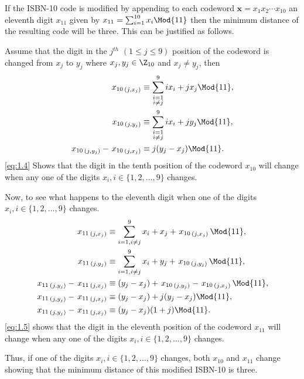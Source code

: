 If the ISBN-10 code is modified by appending to each codeword $\textbf{x}=x_1x_2\cdots x_{10}$ an eleventh digit $x_{11}$ given by $x_{11}=\sum_{i=1}^{10} x_i \Mod{11}$ then the minimum distance of the resulting code will be three. This can be justified as follows.

Assume that the digit in the $j^{th}$  $(1\leq j \leq 9)$ position of the codeword is changed from $x_j$ to $y_j$ where $x_j,y_j \in \Z_{10}$ and $x_j \not= y_j$, then
\begin{align}
\label{eq:1.4}
	\left.x_{10}\right._{(j,x_{j})} &\equiv \sum_{\substack{i=1\\ i\neq j}}^9 ix_i + jx_j \Mod{11},\nonumber\\
	\left.x_{10}\right._{(j,y_{j})} &\equiv \sum_{\substack{i=1\\ i\neq j}}^9 ix_i + jy_j \Mod{11},\nonumber\\
	\left.x_{10}\right._{(j,y_{j})} - \left.x_{10}\right._{(j,x_{j})} &\equiv j(y_j-x_j) \Mod{11}.
\end{align}
\eqref{eq:1.4} Shows that the digit in the tenth position of the codeword $x_{10}$ will change when any one of the digits $x_i, i\in\{1,2,\ldots,9\}$ changes.

Now, to see what happens to the eleventh digit when one of the digits $x_i, i\in\{1,2,\ldots,9\}$ changes.
\begin{align}
\label{eq:1.5}
	\left.x_{11}\right._{(j,x_j)} &\equiv \sum_{i=1, i\neq j}^9 x_i + x_j + \left.x_{10}\right._{(j,x_j)}\Mod{11},\nonumber\\
	\left.x_{11}\right._{(j,y_j)} &\equiv \sum_{i=1, i\neq j}^9 x_i + y_j + \left.x_{10}\right._{(j,y_j)}\Mod{11},\nonumber\\
	\left.x_{11}\right._{(j,y_j)}-\left.x_{11}\right._{(j,x_j)} &\equiv (y_j-x_j) +\left.x_{10}\right._{(j,y_j)}-\left.x_{10}\right._{(j,x_j)}\Mod{11},\nonumber\\
	\left.x_{11}\right._{(j,y_j)}-\left.x_{11}\right._{(j,x_j)} &\equiv (y_j-x_j) + j(y_j-x_j) \Mod{11},\nonumber\\
	\left.x_{11}\right._{(j,y_j)}-\left.x_{11}\right._{(j,x_j)} &\equiv (y_j-x_j)(1 + j) \Mod{11}.
\end{align}
\eqref{eq:1.5} shows that the digit in the eleventh position of the codeword $x_{11}$ will change when any one of the digits $x_i, i\in\{1,2,\ldots,9\}$ changes. 

Thus, if one of the digits $x_i, i\in\{1,2,\ldots,9\}$ changes, both $x_{10}$ and $x_{11}$ change showing that the minimum distance of this modified ISBN-10 is three.

